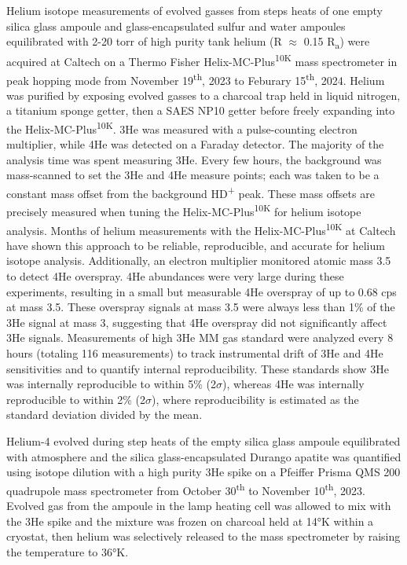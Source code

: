 Helium isotope measurements of evolved gasses from steps heats of one empty silica glass ampoule and glass-encapsulated sulfur and water ampoules equilibrated with 2-20 torr of high purity tank helium (R $\approx$ 0.15 R\textsubscript{a}) were acquired at Caltech on a Thermo Fisher Helix-MC-Plus\textsuperscript{10K} mass spectrometer in peak hopping mode from November 19\textsuperscript{th}, 2023 to Feburary 15\textsuperscript{th}, 2024. Helium was purified by exposing evolved gasses to a charcoal trap held in liquid nitrogen, a titanium sponge getter, then a SAES NP10 getter before freely expanding into the Helix-MC-Plus\textsuperscript{10K}. 3He was measured with a pulse-counting electron multiplier, while 4He was detected on a Faraday detector. The majority of the analysis time was spent measuring 3He. Every few hours, the background was mass-scanned to set the 3He and 4He measure points; each was taken to be a constant mass offset from the background HD\textsuperscript{+} peak. These mass offsets are precisely measured when tuning the Helix-MC-Plus\textsuperscript{10K} for helium isotope analysis. Months of helium measurements with the Helix-MC-Plus\textsuperscript{10K} at Caltech have shown this approach to be reliable, reproducible, and accurate for helium isotope analysis. Additionally, an electron multiplier monitored atomic mass 3.5 to detect 4He overspray. 4He abundances were very large during these experiments, resulting in a small but measurable 4He overspray of up to 0.68 cps at mass 3.5. These overspray signals at mass 3.5 were always less than 1\% of the 3He signal at mass 3, suggesting that 4He overspray did not significantly affect 3He signals. Measurements of high 3He MM gas standard were analyzed every 8 hours (totaling 116 measurements) to track instrumental drift of 3He and 4He sensitivities and to quantify internal reproducibility. These standards show 3He was internally reproducible to within 5\% (2$\sigma$), whereas 4He was internally reproducible to within 2\% (2$\sigma$), where reproducibility is estimated as the standard deviation divided by the mean.

Helium-4 evolved during step heats of the empty silica glass ampoule equilibrated with atmosphere and the silica glass-encapsulated Durango apatite was quantified using isotope dilution with a high purity 3He spike on a Pfeiffer Prisma QMS 200 quadrupole mass spectrometer from October 30\textsuperscript{th} to November 10\textsuperscript{th}, 2023. Evolved gas from the ampoule in the lamp heating cell was allowed to mix with the 3He spike and the mixture was frozen on charcoal held at 14°K within a cryostat, then helium was selectively released to the mass spectrometer by raising the temperature to 36°K.

